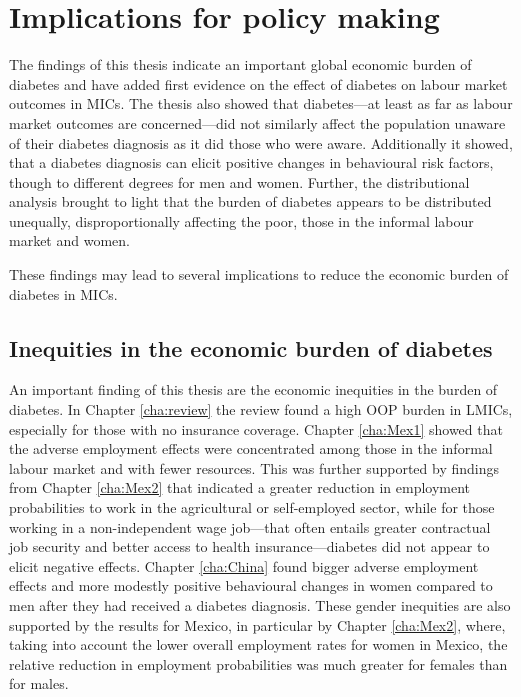 \section{Implications for policy making}

The findings of this thesis indicate an important global economic burden of diabetes and have added first evidence on the effect of diabetes on labour market outcomes in \acp{MIC}. The thesis also showed that diabetes---at least as far as labour market outcomes are concerned---did not similarly affect the population unaware of their diabetes diagnosis as it did those who were aware. Additionally it showed, that a diabetes diagnosis can elicit positive changes in behavioural risk factors, though to different degrees for men and women. Further, the distributional analysis brought to light that the burden of diabetes appears to be distributed unequally, disproportionally affecting the poor, those in the informal labour market and women.

These findings may lead to several implications to reduce the economic burden of diabetes in \acp{MIC}. 

\subsection{Inequities in the economic burden of diabetes}

An important finding of this thesis are the economic inequities in the burden of diabetes. In Chapter \ref{cha:review} the review found a high \ac{OOP} burden in \acp{LMIC}, especially for those with no insurance coverage. Chapter \ref{cha:Mex1} showed that the adverse employment effects were concentrated among those in the informal labour market and with fewer resources. This was further supported by findings from Chapter \ref{cha:Mex2} that indicated a greater reduction in employment probabilities to work in the agricultural or self-employed sector, while for those working in a non-independent wage job---that often entails greater contractual job security and better access to health insurance---diabetes did not appear to elicit negative effects. Chapter \ref{cha:China} found bigger adverse employment effects and more modestly positive behavioural changes in women compared to men after they had received a diabetes diagnosis. These gender inequities are also supported by the results for Mexico, in particular by Chapter \ref{cha:Mex2}, where, taking into account the lower overall employment rates for women in Mexico, the relative reduction in employment probabilities was much greater for females than for males.


